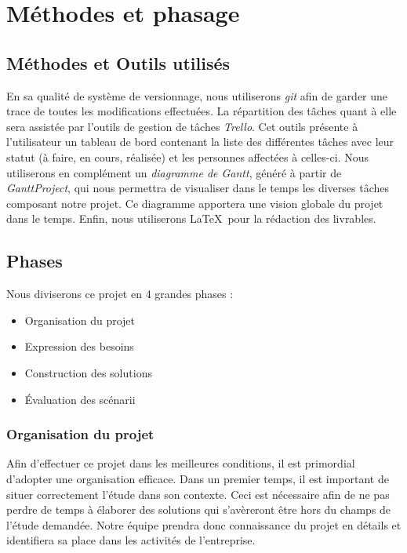 \chapter{Méthodes et phasage}


\section{Méthodes et Outils utilisés}

En sa qualité de système de versionnage, nous utiliserons \textit{git} afin de garder une trace de toutes les modifications effectuées.
La répartition des tâches quant à elle sera assistée par l'outils de gestion de tâches \textit{Trello}. Cet outils présente à l'utilisateur un tableau de bord contenant la liste des différentes tâches avec leur statut (à faire, en cours, réalisée) et les personnes affectées à celles-ci.
Nous utiliserons en complément un \textit{diagramme de Gantt}, généré à partir de \textit{GanttProject}, qui nous permettra de visualiser dans le temps les diverses tâches composant notre projet. Ce diagramme apportera une vision globale du projet dans le temps.
Enfin, nous utiliserons \LaTeX \ pour la rédaction des livrables.


\section{Phases}

Nous diviserons ce projet en 4 grandes phases :

\begin{itemize}
 \item Organisation du projet
 \item Expression des besoins
 \item Construction des solutions
 \item Évaluation des scénarii
\end{itemize} 

\subsection{Organisation du projet}

Afin d'effectuer ce projet dans les meilleures conditions, il est primordial d'adopter une organisation efficace.
Dans un premier temps, il est important de situer correctement l'étude dans son contexte. 
Ceci est nécessaire afin de ne pas perdre de temps à élaborer des solutions qui s'avèreront être hors du champs de l'étude demandée.
Notre équipe prendra donc connaissance du projet en détails et identifiera sa place dans les activités de l'entreprise.

